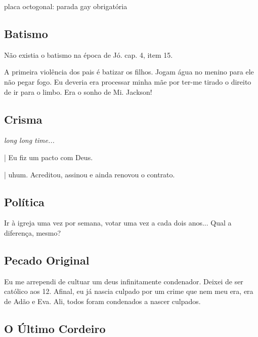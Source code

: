 \documentclass[12pt,a4paper]{article}
\begin{document}
placa octogonal: parada gay obrigat\'oria

		\subsection{Batismo}
			\begin{flushright}
			\end{flushright}

N\~ao existia o batismo na \'epoca de J\'o. \cite{ese} cap. 4, item 15.

A primeira viol\^encia dos pais \'e batizar os filhos. Jogam \'agua no menino
para ele n\~ao pegar fogo. Eu deveria era processar minha m\~ae por ter-me
tirado o direito de ir para o limbo. Era o sonho de Mi. Jackson!

		\subsection{Crisma}
		\begin{flushright}
		\end{flushright}

\emph{long long time...}

| Eu fiz um pacto com Deus.

| uhum. Acreditou, assinou e ainda renovou o contrato.

		\subsection{Pol\'itica}
		\begin{flushright}
		\end{flushright}

Ir \`a igreja uma vez por semana, votar uma vez a cada dois anos... Qual a diferen\c{c}a, mesmo?

		\subsection{Pecado Original}
		\begin{flushright}
		\end{flushright}

Eu me arrependi de cultuar um deus infinitamente condenador. Deixei de ser cat\'olico aos 12. Afinal, eu j\'a nascia culpado por um crime que nem meu era, era de Ad\~ao e Eva. Ali, todos foram condenados a nascer culpados.

		\subsection {O \'Ultimo Cordeiro}
\end{document}
